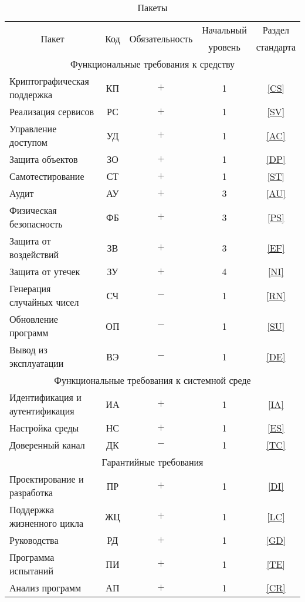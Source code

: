 \begin{table}[hbt]
\caption{Пакеты}\label{Table.COMMON.Packages}
\begin{tabular}{|l|c|c|c|c|}
\hline
\multicolumn{1}{|c|}{\multirow{2}{*}{Пакет}} & 
\multirow{2}{*}{Код} & 
\multirow{2}{*}{Обязательность} & 
Начальный & Раздел\\
&&& уровень & стандарта\\
\hline
\hline
\multicolumn{5}{|c|}{Функциональные требования к средству}\\
\hline
Криптографическая поддержка & КП & $+$ & 1 & \ref{CS}\\
Реализация сервисов         & РС & $+$ & 1 & \ref{SV}\\
Управление доступом         & УД & $+$ & 1 & \ref{AC}\\
Защита объектов             & ЗО & $+$ & 1 & \ref{DP}\\
Самотестирование            & СТ & $+$ & 1 & \ref{ST}\\
Аудит                       & АУ & $+$ & 3 & \ref{AU}\\
Физическая безопасность     & ФБ & $+$ & 3 & \ref{PS}\\
Защита от воздействий       & ЗВ & $+$ & 3 & \ref{EF}\\
Защита от утечек            & ЗУ & $+$ & 4 & \ref{NI}\\
Генерация случайных чисел   & СЧ & $-$ & 1 & \ref{RN}\\
Обновление программ         & ОП & $-$ & 1 & \ref{SU}\\
Вывод из эксплуатации       & ВЭ & $-$ & 1 & \ref{DE}\\
\hline
\multicolumn{5}{|c|}{Функциональные требования к системной среде}\\
\hline
Идентификация и аутентификация & ИА & $+$ & 1 & \ref{IA}\\
Настройка среды                & НС & $+$ & 1 & \ref{ES}\\
Доверенный канал               & ДК & $-$ & 1 & \ref{TC}\\
\hline
\multicolumn{5}{|c|}{Гарантийные требования}\\
\hline
Проектирование и разработка & ПР & $+$ & 1 &\ref{DI}\\
Поддержка жизненного цикла  & ЖЦ & $+$ & 1 &\ref{LC}\\
Руководства                 & РД & $+$ & 1 &\ref{GD}\\
Программа испытаний         & ПИ & $+$ & 1 &\ref{TE}\\
Анализ программ             & АП & $+$ & 1 &\ref{CR}\\
\hline
\end{tabular}
\end{table}

